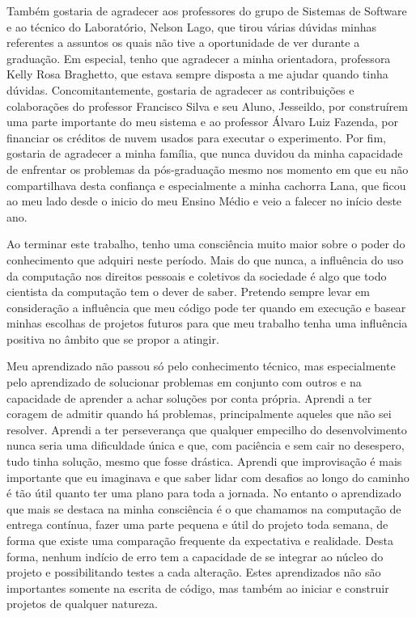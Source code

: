 \documentclass[11pt,twoside,a4paper]{book}
\begin{document}
 Também gostaria de agradecer aos professores do grupo de Sistemas de Software e ao técnico do Laboratório, Nelson Lago, que tirou várias dúvidas minhas referentes a assuntos os quais não tive a oportunidade de ver durante a graduação. Em especial, tenho que agradecer a minha orientadora, professora Kelly Rosa Braghetto, que estava sempre disposta a me ajudar quando tinha dúvidas. Concomitantemente, gostaria de agradecer as contribuições e colaborações do professor Francisco Silva e seu Aluno, Jesseildo, por construírem uma parte importante do meu sistema e ao professor Álvaro Luiz Fazenda, por financiar os créditos de nuvem usados para executar o experimento. Por fim, gostaria de agradecer a minha família, que nunca duvidou da minha capacidade de enfrentar os problemas da pós-graduação mesmo nos momento em que eu não compartilhava desta confiança e especialmente a minha cachorra Lana, que ficou ao meu lado desde o inicio do meu Ensino Médio e veio a falecer no início deste ano. 
 
 Ao terminar este trabalho, tenho uma consciência muito maior sobre o poder do conhecimento que adquiri neste período. Mais do que nunca, a influência do uso da computação nos direitos pessoais e coletivos da sociedade é algo que todo cientista da computação tem o dever de saber. Pretendo sempre levar em consideração a influência que meu código pode ter quando em execução e basear minhas escolhas de projetos futuros para que meu trabalho tenha uma influência positiva no âmbito que se propor a atingir.
 
 Meu aprendizado não passou só pelo conhecimento técnico, mas especialmente pelo aprendizado de solucionar problemas em conjunto com outros e na capacidade de aprender a achar soluções por conta própria. Aprendi a ter coragem de admitir quando há problemas, principalmente aqueles que não sei resolver. Aprendi a ter perseverança que qualquer empecilho do desenvolvimento nunca seria uma dificuldade única e que, com paciência e sem cair no desespero, tudo tinha solução, mesmo que fosse drástica. Aprendi que improvisação é mais importante que eu imaginava e que saber lidar com desafios ao longo do caminho é tão útil quanto ter uma plano para toda a jornada. No entanto o aprendizado que mais se destaca na minha consciência é o que chamamos na computação de entrega contínua, fazer uma parte pequena e útil do projeto toda semana, de forma que existe uma comparação frequente da expectativa e realidade. Desta forma, nenhum indício de erro tem a capacidade de se integrar ao núcleo do projeto e possibilitando testes a cada alteração. Estes aprendizados não são importantes somente na escrita de código, mas também ao iniciar e construir projetos de qualquer natureza. 
 
\end{document}
